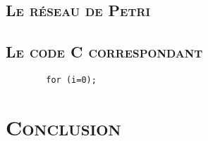 \section{\textsc{Le réseau de Petri}}
	
	\begin{center}
	\label{fig3} 
	\end{center}  

\section{\textsc{Le code C correspondant}}
	\begin{lstlisting}
		for (i=0);
	\end{lstlisting}


\chapter*{\textsc{Conclusion}}

	\paragraph{}